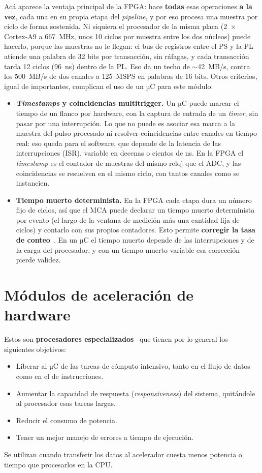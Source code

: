 Acá aparece la ventaja principal de la FPGA: hace \textbf{todas} esas
operaciones \textbf{a la vez}, cada una en su propia etapa del \emph{pipeline}, y por
eso procesa una muestra por ciclo de forma sostenida. Ni siquiera el procesador
de la misma placa (2~$\times$ Cortex-A9 a 667~MHz, unos 10 ciclos por muestra
entre los dos núcleos) puede hacerlo, porque las muestras no le llegan: el bus de
registros entre el PS y la PL atiende una palabra de 32 bits por transacción, sin
ráfagas, y cada transacción tarda 12 ciclos (96~ns) dentro de la PL. Eso da un
techo de $\sim$42~MB/s, contra los 500~MB/s de dos canales a 125~MSPS en
palabras de 16 bits. Otros criterios, igual de importantes, complican el uso de
un µC para este módulo:
\begin{itemize}
  \item \textbf{\emph{Timestamps} y coincidencias multitrigger.} Un µC puede marcar el
    tiempo de un flanco por hardware, con la captura de entrada de un \emph{timer}, sin
    pasar por una interrupción. Lo que no puede es asociar esa marca a la
    muestra del pulso procesado ni resolver coincidencias entre canales en
    tiempo real: eso queda para el software, que depende de la latencia de las
    interrupciones (ISR), variable en decenas o cientos de ns. En la FPGA el
    \emph{timestamp} es el contador de muestras del mismo reloj que el ADC, y las
    coincidencias se resuelven en el mismo ciclo, con tantos canales como se
    instancien.
  \item \textbf{Tiempo muerto determinista.} En la FPGA cada etapa dura un número
    fijo de ciclos, así que el MCA puede declarar un tiempo muerto determinista
    por evento (el largo de la ventana de medición más una cantidad fija de
    ciclos) y contarlo con sus propios contadores. Esto permite \textbf{corregir
    la tasa de conteo}~\cite{Knoll2010}. En un µC el tiempo muerto depende de las
    interrupciones y de la carga del procesador, y con un tiempo muerto variable
    esa corrección pierde validez.
\end{itemize}

\section{Módulos de aceleración de hardware}
\label{S:hw-modulos-aceleracion}

Estos son \textbf{procesadores especializados}~\cite{Crockett2014} que tienen
por lo general los siguientes objetivos:
\begin{itemize}
  \item Liberar al µC de las tareas de cómputo intensivo, tanto en el flujo de
    datos como en el de instrucciones.
  \item Aumentar la capacidad de respuesta (\emph{responsiveness}) del sistema,
    quitándole al procesador esas tareas largas.
  \item Reducir el consumo de potencia.
  \item Tener un mejor manejo de errores a tiempo de ejecución.
\end{itemize}
Se utilizan cuando transferir los datos al acelerador cuesta menos potencia o
tiempo que procesarlos en la CPU.


